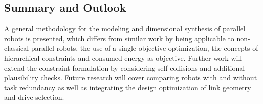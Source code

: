\documentclass[fleqn,a4paper,10pt]{article}
\begin{document}
\begin{multicols}{2}




\section{Summary and Outlook}
\label{sec:summary}

A general methodology for the modeling and dimensional synthesis of parallel robots is presented, which differs from similar work by being applicable to non-classical parallel robots, the use of a single-objective optimization, the concepts of hierarchical constraints and consumed energy as objective. 
Further work will extend the constraint formulation by considering self-collisions and  additional plausibility checks.
Future research will cover comparing robots with and without task redundancy as well as integrating the design optimization of link geometry and drive selection.


\end{multicols}
\end{document}
